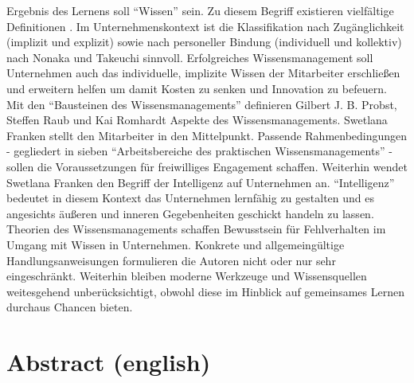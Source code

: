 \documentclass[12pt]{article}
\begin{document}
Ergebnis des Lernens soll ``Wissen'' sein. Zu diesem Begriff existieren
vielfältige Definitionen \cite{Schilcher:2006}. Im Unternehmenskontext ist die
Klassifikation nach Zugänglichkeit (implizit und explizit) sowie nach personeller
Bindung (individuell und kollektiv) nach Nonaka und Takeuchi \cite{Nonaka:1997}
sinnvoll. Erfolgreiches Wissensmanagement soll Unternehmen auch das individuelle,
implizite Wissen der Mitarbeiter erschließen und erweitern helfen um damit Kosten
zu senken und Innovation zu befeuern.
Mit den ``Bausteinen des Wissensmanagements'' definieren Gilbert J. B. Probst, 
Steffen Raub und Kai Romhardt \cite{Probst:2006} Aspekte des Wissensmanagements.
Swetlana Franken \cite{Franken:2007} stellt den Mitarbeiter in den Mittelpunkt.
Passende Rahmenbedingungen - gegliedert in sieben ``Arbeitsbereiche des praktischen
Wissensmanagements'' - sollen die Voraussetzungen für freiwilliges Engagement
schaffen.
Weiterhin wendet Swetlana Franken den Begriff der Intelligenz auf Unternehmen an.
``Intelligenz'' bedeutet in diesem Kontext das Unternehmen lernfähig zu gestalten
und es angesichts äußeren und inneren Gegebenheiten geschickt handeln zu lassen.
Theorien des Wissensmanagements schaffen Bewusstsein für Fehlverhalten im Umgang
mit Wissen in Unternehmen. Konkrete und allgemeingültige Handlungsanweisungen 
formulieren die Autoren nicht oder nur sehr eingeschränkt. Weiterhin bleiben moderne
Werkzeuge und Wissensquellen weitesgehend unberücksichtigt, obwohl diese im 
Hinblick auf gemeinsames Lernen durchaus Chancen bieten.



\section{Abstract (english)}
\end{document}
